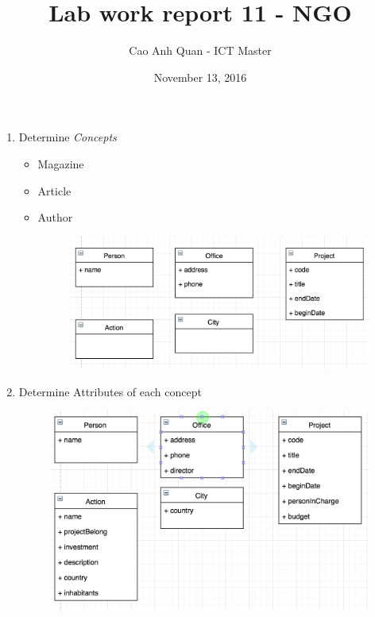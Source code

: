 \documentclass[12pt]{article}
\title{Lab work report 11 - NGO}
\author{Cao Anh Quan - ICT Master}
\date{November 13, 2016}
\begin{document}
 
\begin{titlepage}
\maketitle
\end{titlepage}

\begin{enumerate}



\item Determine \emph{Concepts}

\begin{itemize}

\item Magazine
\item Article
\item Author
\begin{figure}[H]
\includegraphics[width=\textwidth]{concept.png}
\end{figure}
\end{itemize}

\item Determine Attributes of each concept
\begin{figure}[H]
\includegraphics[width=\textwidth]{attributes.png}
\end{figure}



\end{enumerate}
\end{document}
